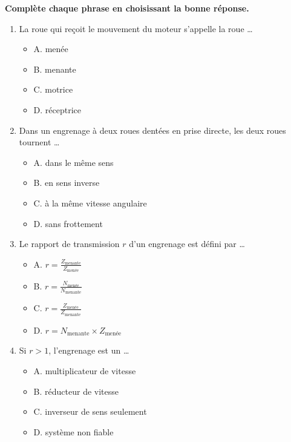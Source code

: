 \documentclass[11pt]{article}
\begin{document}
\begin{exercice}
\textbf{Complète chaque phrase en choisissant la bonne réponse.}
\begin{enumerate}
    \item La roue qui reçoit le mouvement du moteur s'appelle la roue \ldots
    \begin{itemize}
        \item A. menée
        \item B. menante
        \item C. motrice
        \item D. réceptrice
    \end{itemize}
    \item Dans un engrenage à deux roues dentées en prise directe, les deux roues tournent \ldots
    \begin{itemize}
        \item A. dans le même sens
        \item B. en sens inverse
        \item C. à la même vitesse angulaire
        \item D. sans frottement
    \end{itemize}
    \item Le rapport de transmission $r$ d'un engrenage est défini par \ldots
    \begin{itemize}
        \item A. $r = \frac{Z_{\text{menante}}}{Z_{\text{menée}}}$
        \item B. $r = \frac{N_{\text{menée}}}{N_{\text{menante}}}$
        \item C. $r = \frac{Z_{\text{menée}}}{Z_{\text{menante}}}$
        \item D. $r = N_{\text{menante}} \times Z_{\text{menée}}$
    \end{itemize}
    \item Si $r > 1$, l'engrenage est un \ldots
    \begin{itemize}
        \item A. multiplicateur de vitesse
        \item B. réducteur de vitesse
        \item C. inverseur de sens seulement
        \item D. système non fiable
    \end{itemize}
\end{enumerate}
\end{exercice}
\end{document}
